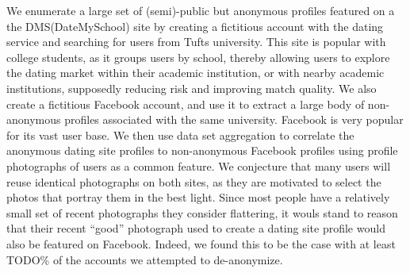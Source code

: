 We enumerate a large set of (semi)-public but anonymous profiles featured on a the DMS(DateMySchool\cite{dms2014}) site by creating a fictitious account with the dating service and searching for users from Tufts university.
This site is popular with college students, as it groups users by school, thereby allowing users to explore the dating market within their academic institution, or with nearby academic institutions, supposedly reducing risk and improving match quality.
We also create a fictitious Facebook\cite{fb2014} account, and use it to extract a large body of non-anonymous profiles associated with the same university.
Facebook is very popular for its vast user base.
We then use data set aggregation to correlate the anonymous dating site profiles to non-anonymous Facebook profiles using profile photographs of users as a common feature.
We conjecture that many users will reuse identical photographs on both sites, as they are motivated to select the photos that portray them in the best light.
Since most people have a relatively small set of recent photographs they consider flattering, it wouls stand to reason that their recent ``good'' photograph used to create a dating site profile would also be featured on Facebook.
Indeed, we found this to be the case with at least TODO\% of the accounts we attempted to de-anonymize.
